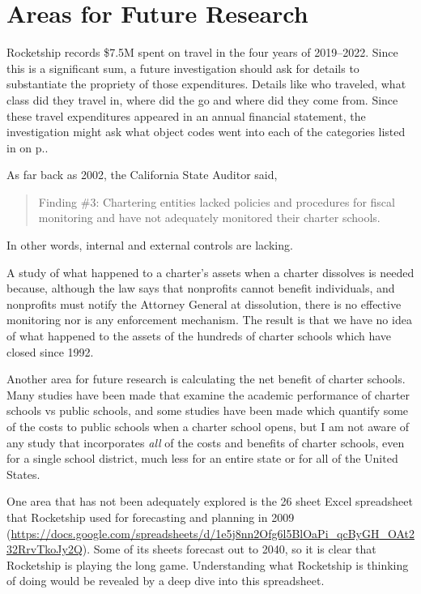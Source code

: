 \newpage
\section{Areas for Future Research}%
\label{sec:areas-future-rese}\indent%

Rocketship records \$7.5M spent on travel in the four years of 2019–2022. Since this is a significant sum, a future investigation should ask for details to substantiate the propriety of those expenditures. Details like who traveled, what class did they travel in, where did the go and where did they come from. Since these travel expenditures appeared in an annual financial statement, the investigation might ask what object codes went into each of the categories listed in  on p.\pageref{tab:consolidated_functional_expenses}.

As far back as 2002, the California State Auditor said, 
  \begin{quote}
    Finding \#3: Chartering entities lacked policies and procedures for fiscal monitoring and have not adequately monitored their charter schools. \parencite{CAStateAuditor2002}
  \end{quote}
In other words, internal and external controls are lacking.

A study of what happened to a charter's assets when a charter dissolves is needed because, although the law says that nonprofits cannot benefit individuals, and nonprofits must notify the Attorney General at dissolution, there is no effective monitoring nor is any enforcement mechanism. The result is that we have no idea of what happened to the assets of the hundreds of charter schools which have closed since 1992.

Another area for future research is calculating the net benefit of charter schools. Many studies have been made that examine the academic performance of charter schools vs public schools, and some studies have been made which quantify some of the costs to public schools when a charter school opens, but I am not aware of any study that incorporates \textit{all} of the costs and benefits of charter schools, even for a single school district, much less for an entire state or for all of the United States.

One area that has not been adequately explored is the 26 sheet Excel spreadsheet that Rocketship used for forecasting and planning in 2009 (\url{https://docs.google.com/spreadsheets/d/1e5j8nn2Ofg6l5BlOaPi_qcByGH_OAt232RrvTkoJy2Q}). Some of its sheets forecast out to 2040, so it is clear that Rocketship is playing the long game. Understanding what Rocketship is thinking of doing would be revealed by a deep dive into this spreadsheet.

